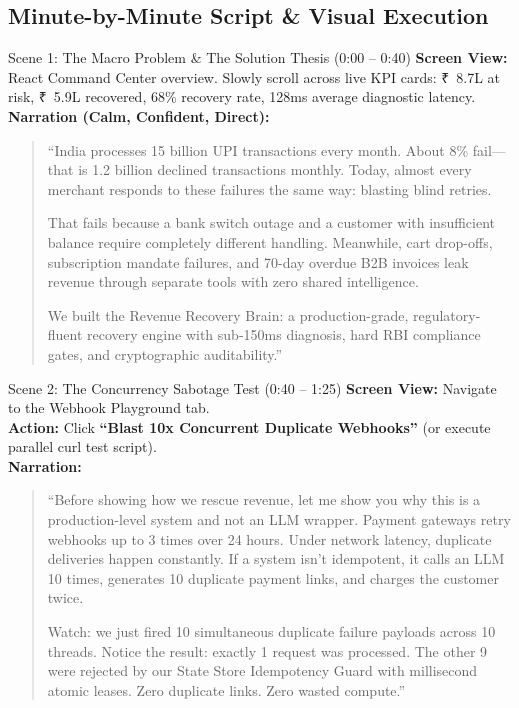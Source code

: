 \documentclass[11pt, a4paper]{article}
\newcommand{\INR}{{\rupeefont ₹}}
\begin{document}
\subsection{Minute-by-Minute Script \& Visual Execution}

\begin{scenebox}{Scene 1: The Macro Problem \& The Solution Thesis (0:00 -- 0:40)}
\textbf{Screen View:} React Command Center overview. Slowly scroll across live KPI cards: \INR~8.7L at risk, \INR~5.9L recovered, 68\% recovery rate, 128ms average diagnostic latency.\\
\textbf{Narration (Calm, Confident, Direct):}
\begin{quote}
``India processes 15 billion UPI transactions every month. About 8\% fail---that is 1.2 billion declined transactions monthly. Today, almost every merchant responds to these failures the same way: blasting blind retries.

That fails because a bank switch outage and a customer with insufficient balance require completely different handling. Meanwhile, cart drop-offs, subscription mandate failures, and 70-day overdue B2B invoices leak revenue through separate tools with zero shared intelligence.

We built the Revenue Recovery Brain: a production-grade, regulatory-fluent recovery engine with sub-150ms diagnosis, hard RBI compliance gates, and cryptographic auditability.''
\end{quote}
\end{scenebox}

\begin{scenebox}{Scene 2: The Concurrency Sabotage Test (0:40 -- 1:25)}
\textbf{Screen View:} Navigate to the Webhook Playground tab.\\
\textbf{Action:} Click \textbf{``Blast 10x Concurrent Duplicate Webhooks''} (or execute parallel curl test script).\\
\textbf{Narration:}
\begin{quote}
``Before showing how we rescue revenue, let me show you why this is a production-level system and not an LLM wrapper. Payment gateways retry webhooks up to 3 times over 24 hours. Under network latency, duplicate deliveries happen constantly. If a system isn't idempotent, it calls an LLM 10 times, generates 10 duplicate payment links, and charges the customer twice.

Watch: we just fired 10 simultaneous duplicate failure payloads across 10 threads. Notice the result: exactly 1 request was processed. The other 9 were rejected by our State Store Idempotency Guard with millisecond atomic leases. Zero duplicate links. Zero wasted compute.''
\end{quote}
\end{scenebox}
\end{document}
